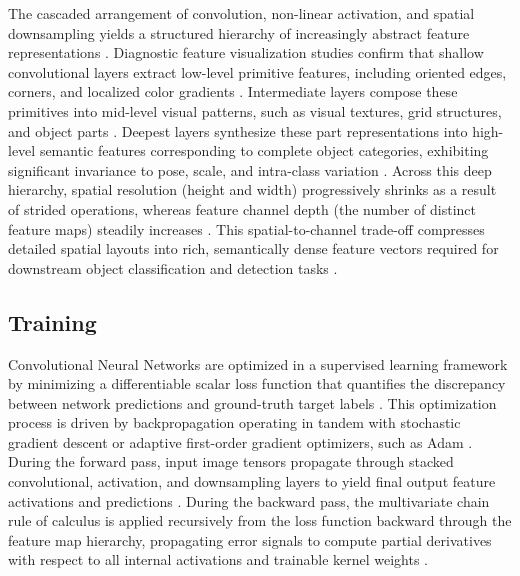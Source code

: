 The cascaded arrangement of convolution, non-linear activation, and spatial downsampling yields a structured hierarchy of increasingly abstract feature representations \parencite{Goodfellow-et-al-2016, fleet_visualizing_2014, lecun_gradient-based_1998}. Diagnostic feature visualization studies confirm that shallow convolutional layers extract low-level primitive features, including oriented edges, corners, and localized color gradients \parencite{fleet_visualizing_2014, Goodfellow-et-al-2016}. Intermediate layers compose these primitives into mid-level visual patterns, such as visual textures, grid structures, and object parts \parencite{fleet_visualizing_2014, Goodfellow-et-al-2016}. Deepest layers synthesize these part representations into high-level semantic features corresponding to complete object categories, exhibiting significant invariance to pose, scale, and intra-class variation \parencite{fleet_visualizing_2014, Goodfellow-et-al-2016}. Across this deep hierarchy, spatial resolution (height and width) progressively shrinks as a result of strided operations, whereas feature channel depth (the number of distinct feature maps) steadily increases \parencite{Goodfellow-et-al-2016, lecun_gradient-based_1998, simonyan_very_2014}. This spatial-to-channel trade-off compresses detailed spatial layouts into rich, semantically dense feature vectors required for downstream object classification and detection tasks \parencite{Goodfellow-et-al-2016, lecun_gradient-based_1998, simonyan_very_2014}.

\subsection{Training}

Convolutional Neural Networks are optimized in a supervised learning framework by minimizing a differentiable scalar loss function that quantifies the discrepancy between network predictions and ground-truth target labels \parencite{rumelhart_learning_1986, lecun_gradient-based_1998}. This optimization process is driven by backpropagation operating in tandem with stochastic gradient descent or adaptive first-order gradient optimizers, such as Adam \parencite{rumelhart_learning_1986, lecun_gradient-based_1998, kingma_adam_2014}. During the forward pass, input image tensors propagate through stacked convolutional, activation, and downsampling layers to yield final output feature activations and predictions \parencite{rumelhart_learning_1986, lecun_gradient-based_1998}. During the backward pass, the multivariate chain rule of calculus is applied recursively from the loss function backward through the feature map hierarchy, propagating error signals to compute partial derivatives with respect to all internal activations and trainable kernel weights \parencite{rumelhart_learning_1986, lecun_gradient-based_1998}.


